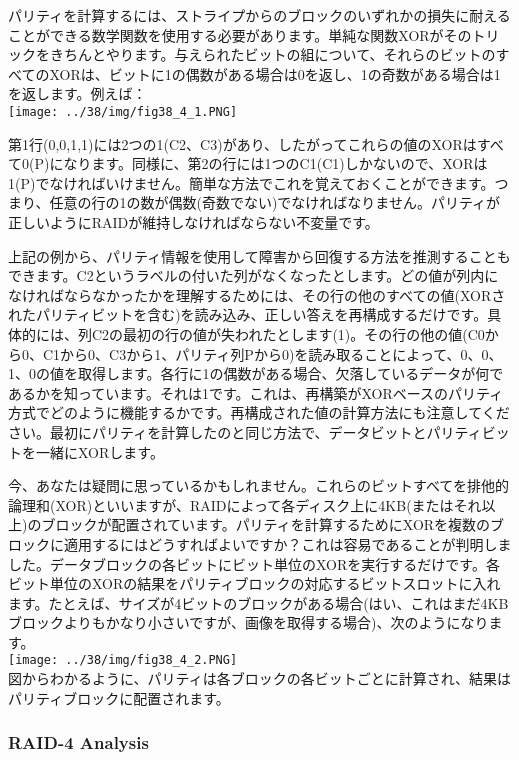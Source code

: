パリティを計算するには、ストライプからのブロックのいずれかの損失に耐えることができる数学関数を使用する必要があります。単純な関数XORがそのトリックをきちんとやります。与えられたビットの組について、それらのビットのすべてのXORは、ビットに1の偶数がある場合は0を返し、1の奇数がある場合は1を返します。例えば：\\
\texttt{[image: ../38/img/fig38\_4\_1.PNG]}

第1行(0,0,1,1)には2つの1(C2、C3)があり、したがってこれらの値のXORはすべて0(P)になります。同様に、第2の行には1つのC1(C1)しかないので、XORは1(P)でなければいけません。簡単な方法でこれを覚えておくことができます。つまり、任意の行の1の数が偶数(奇数でない)でなければなりません。パリティが正しいようにRAIDが維持しなければならない不変量です。

上記の例から、パリティ情報を使用して障害から回復する方法を推測することもできます。C2というラベルの付いた列がなくなったとします。どの値が列内になければならなかったかを理解するためには、その行の他のすべての値(XORされたパリティビットを含む)を読み込み、正しい答えを再構成するだけです。具体的には、列C2の最初の行の値が失われたとします(1)。その行の他の値(C0から0、C1から0、C3から1、パリティ列Pから0)を読み取ることによって、0、0、1、0の値を取得します。各行に1の偶数がある場合、欠落しているデータが何であるかを知っています。それは1です。これは、再構築がXORベースのパリティ方式でどのように機能するかです。再構成された値の計算方法にも注意してください。最初にパリティを計算したのと同じ方法で、データビットとパリティビットを一緒にXORします。

今、あなたは疑問に思っているかもしれません。これらのビットすべてを排他的論理和(XOR)といいますが、RAIDによって各ディスク上に4KB(またはそれ以上)のブロックが配置されています。パリティを計算するためにXORを複数のブロックに適用するにはどうすればよいですか？これは容易であることが判明しました。データブロックの各ビットにビット単位のXORを実行するだけです。各ビット単位のXORの結果をパリティブロックの対応するビットスロットに入れます。たとえば、サイズが4ビットのブロックがある場合(はい、これはまだ4KBブロックよりもかなり小さいですが、画像を取得する場合)、次のようになります。\\
\texttt{[image: ../38/img/fig38\_4\_2.PNG]}\\
図からわかるように、パリティは各ブロックの各ビットごとに計算され、結果はパリティブロックに配置されます。

\hypertarget{raid-4-analysis}{%
\subsubsection*{RAID-4 Analysis}\label{raid-4-analysis}}

